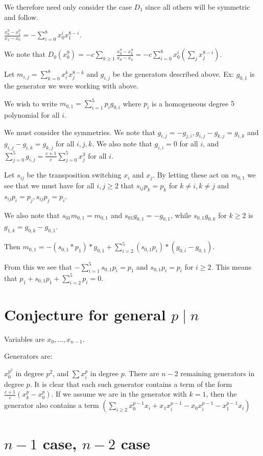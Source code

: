 \documentclass{article}
\numberwithin{equation}{section}
\begin{document}
We therefore need only consider the case $D_1$ since all others will be symmetric and follow.

$\frac{x_0^9-x_1^9}{x_1-x_0}=-\sum_{i=0}^8 x_0^ix_1^{8-i}$.

We note that $D_0(x_0^9) = -c\sum_{k \ge 1} \frac{x_0^9-x_k^9}{x_0-x_k} = -c \sum_{i=0}^8 x_0^i(\sum_j x_j^{8-i})$. 

Let $m_{i,j}=\sum_{k=0}^8 x_i^kx_j^{8-k}$ and $g_{i,j}$ be the generators described above. Ex: $g_{0,1}$ is the generator we were working with above. 

We wish to write $m_{0,1}=\sum_{i=1}^5 p_ig_{0,i}$ where $p_i$ is a homogeneous degree $5$ polynomial for all $i$. 

We must consider the symmetries. We note that $g_{i,j}=-g_{j,i}, g_{i,j}-g_{k,j}=g_{i,k}$ and $g_{i,j}-g_{i,k}=g_{k,j}$ for all $i,j,k$. We also note that $g_{i,i}=0$ for all $i$, and $\sum_{j=0}^5 g_{i,j} = \frac{c+1}{c}\sum_{j=0}^5 x_j^3$ for all $i$. 

Let $s_{ij}$ be the transposition switching $x_i$ and $x_j$. By letting these act on $m_{0,1}$ we see that we must have for all $i,j \ge 2$ that $s_{ij}p_k=p_k$ for $k \ne i, k \ne j$ and $s_{ij}p_i=p_j,s_{ij}p_j=p_i$. 

We also note that $s_{01}m_{0,1}=m_{0,1}$ and $s_{01}g_{0,1}=-g_{0,1}$, while $s_{0,1}g_{0,k}$ for $k \ge 2$ is $g_{1,k}=g_{0,k}-g_{0,1}$. 

Then $m_{0,1}=-(s_{0,1}*p_1)*g_{0,1}+\sum_{i=2}^5 (s_{0,1}p_i)*(g_{0,i}-g_{0,1})$. 

From this we see that $-\sum_{i=1}^5 s_{0,1}p_i=p_1$ and $s_{0,1}p_i=p_i$ for $i \ge 2$. This means that $p_1+s_{0,1}p_1+\sum_{i=2}^5 p_i = 0$. 


\section{Conjecture for general $p \mid n$}

Variables are $x_0,\dots,x_{n-1}$.

Generators are:

$x_0^{p^2}$ in degree $p^2$, and $\sum x_i^p$ in degree $p$. There are $n-2$ remaining generators in degree $p$. It is clear that each such generator contains a term of the form $\frac{c+1}{c}(x_k^p-x_0^p)$. If we assume we are in the generator with $k=1$, then the generator also contains a term $\left(\sum_{i \ge 2} x_0^{p-1}x_i+x_1x_i^{p-1}-x_0x_i^{p-1}-x_1^{p-1}x_i\right)$


\section{$n-1$ case, $n-2$ case}
\end{document}
